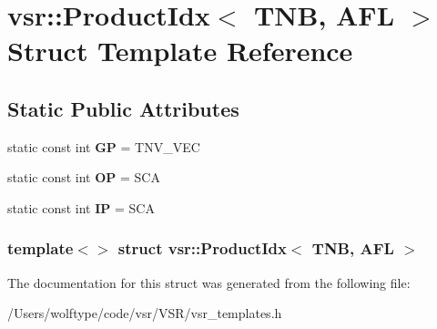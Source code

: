 \hypertarget{structvsr_1_1_product_idx_3_01_t_n_b_00_01_a_f_l_01_4}{\section{vsr\-:\-:Product\-Idx$<$ T\-N\-B, A\-F\-L $>$ Struct Template Reference}
\label{structvsr_1_1_product_idx_3_01_t_n_b_00_01_a_f_l_01_4}
}
\subsection*{Static Public Attributes}
\begin{DoxyCompactItemize}
\item 
\hypertarget{structvsr_1_1_product_idx_3_01_t_n_b_00_01_a_f_l_01_4_a30a2ac439adc1511c64877922cbe2c90}{static const int {\bfseries G\-P} = T\-N\-V\-\_\-\-V\-E\-C}\label{structvsr_1_1_product_idx_3_01_t_n_b_00_01_a_f_l_01_4_a30a2ac439adc1511c64877922cbe2c90}

\item 
\hypertarget{structvsr_1_1_product_idx_3_01_t_n_b_00_01_a_f_l_01_4_ab932c167012b6194ee5007ad90b3ec29}{static const int {\bfseries O\-P} = S\-C\-A}\label{structvsr_1_1_product_idx_3_01_t_n_b_00_01_a_f_l_01_4_ab932c167012b6194ee5007ad90b3ec29}

\item 
\hypertarget{structvsr_1_1_product_idx_3_01_t_n_b_00_01_a_f_l_01_4_a1bc988d6f0dffb29dd1b3e07cb209984}{static const int {\bfseries I\-P} = S\-C\-A}\label{structvsr_1_1_product_idx_3_01_t_n_b_00_01_a_f_l_01_4_a1bc988d6f0dffb29dd1b3e07cb209984}

\end{DoxyCompactItemize}
\subsubsection*{template$<$$>$ struct vsr\-::\-Product\-Idx$<$ T\-N\-B, A\-F\-L $>$}



The documentation for this struct was generated from the following file\-:\begin{DoxyCompactItemize}
\item 
/\-Users/wolftype/code/vsr/\-V\-S\-R/vsr\-\_\-templates.\-h\end{DoxyCompactItemize}
